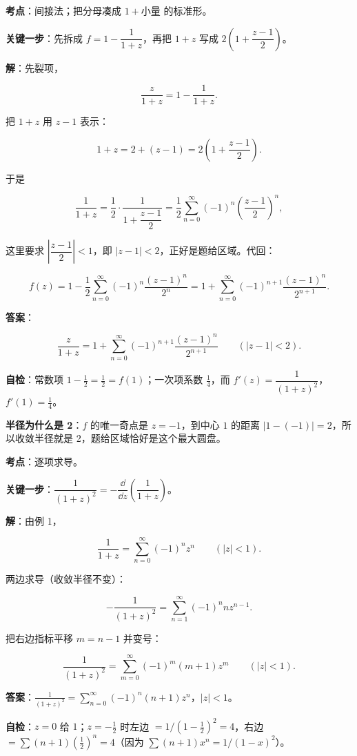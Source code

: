 \documentclass[11pt]{ctexart}
\renewcommand{\qbreak}{\needspace{0.45\textheight}}
\begin{document}
\textbf{考点}：间接法；把分母凑成 $1+\text{小量}$ 的标准形。

\textbf{关键一步}：先拆成 $f=1-\dfrac{1}{1+z}$，再把 $1+z$ 写成 $2\left(1+\dfrac{z-1}{2}\right)$。

\textbf{解}：先裂项，

\[ \frac{z}{1+z}=1-\frac{1}{1+z} . \]

把 $1+z$ 用 $z-1$ 表示：

\[ 1+z=2+(z-1)=2\left(1+\frac{z-1}{2}\right) . \]

于是

\[ \frac{1}{1+z}=\frac12\cdot\frac{1}{1+\dfrac{z-1}{2}}=\frac12\sum_{n=0}^{\infty}(-1)^n\left(\frac{z-1}{2}\right)^n , \]

这里要求 $\left|\dfrac{z-1}{2}\right|<1$，即 $|z-1|<2$，正好是题给区域。代回：

\[ f(z)=1-\frac12\sum_{n=0}^{\infty}(-1)^n\frac{(z-1)^n}{2^n}=1+\sum_{n=0}^{\infty}(-1)^{n+1}\frac{(z-1)^n}{2^{n+1}} . \]

\textbf{答案}：

\[ \frac{z}{1+z}=1+\sum_{n=0}^{\infty}(-1)^{n+1}\frac{(z-1)^n}{2^{n+1}}\qquad(|z-1|<2) . \]

\textbf{自检}：常数项 $1-\tfrac12=\tfrac12=f(1)$；一次项系数 $\tfrac14$，而 $f'(z)=\dfrac{1}{(1+z)^2}$，$f'(1)=\tfrac14$。

\textbf{半径为什么是 2}：$f$ 的唯一奇点是 $z=-1$，到中心 $1$ 的距离 $|1-(-1)|=2$，所以收敛半径就是 2，题给区域恰好是这个最大圆盘。

\qbreak
{}

\textbf{考点}：逐项求导。

\textbf{关键一步}：$\dfrac{1}{(1+z)^2}=-\dfrac{\dd}{\dd z}\left(\dfrac{1}{1+z}\right)$。

\textbf{解}：由例 1，

\[ \frac{1}{1+z}=\sum_{n=0}^{\infty}(-1)^n z^n\qquad(|z|<1) . \]

两边求导（收敛半径不变）：

\[ -\frac{1}{(1+z)^2}=\sum_{n=1}^{\infty}(-1)^n n z^{n-1} . \]

把右边指标平移 $m=n-1$ 并变号：

\[ \frac{1}{(1+z)^2}=\sum_{m=0}^{\infty}(-1)^m(m+1)z^m\qquad(|z|<1) . \]

\textbf{答案}：$\displaystyle\frac{1}{(1+z)^2}=\sum_{n=0}^{\infty}(-1)^n(n+1)z^n$，$|z|<1$。

\textbf{自检}：$z=0$ 给 $1$；$z=-\tfrac12$ 时左边 $=1/(1-\tfrac12)^2=4$，右边 $=\sum(n+1)(\tfrac12)^n=4$（因为 $\sum(n+1)x^n=1/(1-x)^2$）。
\end{document}
